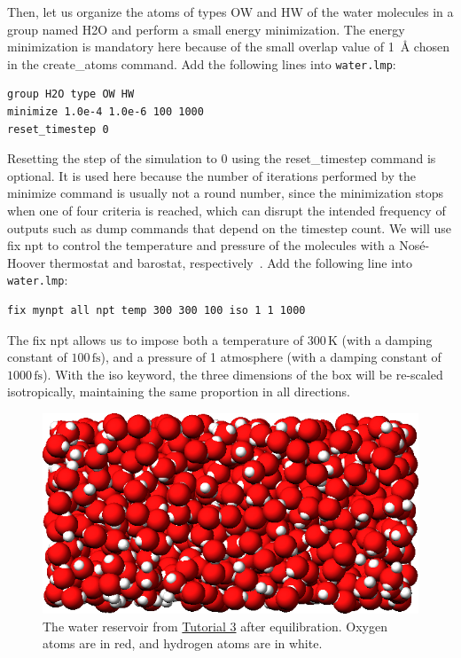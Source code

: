\documentclass[9pt,tutorial]{livecoms}
\newcommand{\lmpcmd}[1]{\colorbox{listing}{\textcolor{command}{\small{#1}}}} %
\newcommand{\flecmd}[1]{\textcolor{command}{\texttt{#1}}} %
\begin{document}
Then, let us organize the atoms of types OW and HW of the water
molecules in a group named \lmpcmd{H2O} and perform a small energy
minimization.  The energy minimization is mandatory here because of the
small \lmpcmd{overlap} value of 1~Å chosen in the \lmpcmd{create\_atoms}
command.  Add the following lines into \flecmd{water.lmp}:
\begin{lstlisting}
group H2O type OW HW
minimize 1.0e-4 1.0e-6 100 1000
reset_timestep 0
\end{lstlisting}
Resetting the step of the simulation to 0 using the
\lmpcmd{reset\_timestep} command is optional.
It is used here because the number of iterations performed by the \lmpcmd{minimize}
command is usually not a round number, since the minimization stops when one of
four criteria is reached, which can disrupt the intended frequency
of outputs such as \lmpcmd{dump} commands that depend on the timestep count.
We will use \lmpcmd{fix npt} to control the temperature
and pressure of the molecules with a Nosé-Hoover thermostat and barostat,
respectively~\cite{nose1984unified, hoover1985canonical, martyna1994constant}.
Add the following line into \flecmd{water.lmp}:
\begin{lstlisting}
fix mynpt all npt temp 300 300 100 iso 1 1 1000
\end{lstlisting}
The \lmpcmd{fix npt} allows us to impose both a temperature of $300\,\text{K}$
(with a damping constant of $100\,\text{fs}$), and a pressure of 1 atmosphere
(with a damping constant of $1000\,\text{fs}$).  With the \lmpcmd{iso} keyword,
the three dimensions of the box will be re-scaled isotropically,
maintaining the same proportion in all directions.

\begin{figure}
\centering
\includegraphics[width=\linewidth]{PEG-water}
\caption{The water reservoir from \hyperref[all-atom-label]{Tutorial 3}
after equilibration.  Oxygen atoms are in red, and hydrogen atoms are in white.}
\label{fig:PEG-water}
\end{figure}
\end{document}
